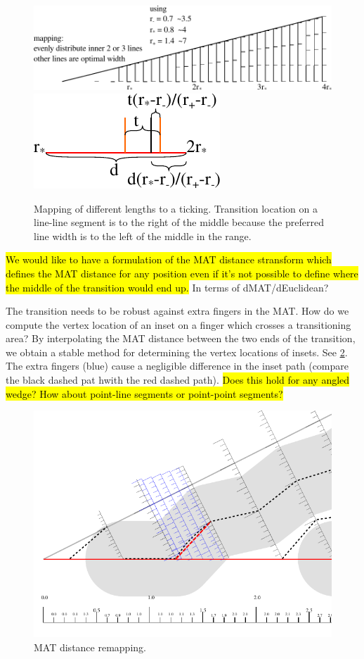 \begin{figure}[H]
\centering
\includegraphics[width=.9\columnwidth]{sources/method/ticking.pdf}
\includegraphics[width=.5\columnwidth]{sources/method/transition_location_precise.pdf}
\caption{Mapping of different lengths to a ticking. Transition location on a line-line segment is to the right of the middle because the preferred line width is to the left of the middle in the range.}
\label{transition_location}
\end{figure}


\hl{We would like to have a formulation of the MAT distance stransform which defines the MAT distance for any position even if it's not possible to define where the middle of the transition would end up.}
In terms of dMAT/dEuclidean?

The transition needs to be robust against extra fingers in the MAT.
How do we compute the vertex location of an inset on a finger which crosses a transitioning area?
By interpolating the MAT distance between the two ends of the transition, we obtain a stable method for determining the vertex locations of insets.
See \cref{distance_rounding_transition}.
The extra fingers (blue) cause a negligible difference in the inset path (compare the black dashed pat hwith the red dashed path).
\hl{Does this hold for any angled wedge? How about point-line segments or point-point segments?}

\begin{figure}[H]
\centering
\includegraphics[width=.9\columnwidth]{sources/method/distance_rounding_transition.pdf}
\caption{MAT distance remapping.}
\label{distance_rounding_transition}
\end{figure}


